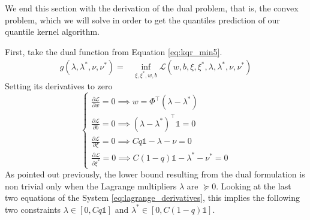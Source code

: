 We end this section with the derivation of the dual problem, that is, the convex problem, which we will solve in order to get the quantiles prediction of our quantile kernel algorithm.

First, take the dual function from Equation \ref{eq:kqr_min5}.
\begin{equation}
    \begin{aligned}
        g(\lambda, \lambda^*, \nu, \nu^*)= & \inf_{\xi, \xi^*, w, b} \mathcal{L}(w,b,\xi,\xi^*,\lambda, \lambda^*, \nu, \nu^*)
\end{aligned}
\end{equation}
Setting its derivatives to zero
\begin{equation}\label{eq:lagrange_derivatives}
    \begin{cases}
        \frac{\partial \mathcal{L}}{\partial w}=0 \implies w=\Phi^\intercal(\lambda-\lambda^*)
        \\
        \frac{\partial \mathcal{L}}{\partial b}=0 \implies (\lambda-\lambda^*)^\intercal\mathbb{1}=0
        \\
        \frac{\partial \mathcal{L}}{\partial \xi}=0 \implies Cq \mathbb{1}-\lambda- \nu=0
        \\
        \frac{\partial \mathcal{L}}{\partial \xi^*}=0 \implies C(1-q)\mathbb{1} -\lambda^* -\nu^*=0
    \end{cases}
\end{equation}
As pointed out previously, the lower bound resulting from the dual formulation is non trivial only when the Lagrange multipliers $\lambda$ are $\succeq 0$. Looking at the last two equations of the System \ref{eq:lagrange_derivatives}, this implies the following two constraints $\lambda \in [0, Cq\mathbb{1}]$ and $\lambda^*\in [0, C(1-q)\mathbb{1}]$.

